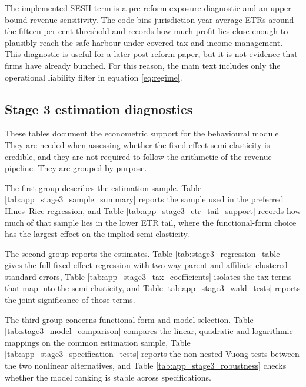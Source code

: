 \documentclass[11pt,a4paper]{article}
\begin{document}
The implemented SESH term is a pre-reform exposure diagnostic and an upper-bound revenue sensitivity. The code bins jurisdiction-year average ETRs around the fifteen per cent threshold and records how much profit lies close enough to plausibly reach the safe harbour under covered-tax and income management. This diagnostic is useful for a later post-reform paper, but it is not evidence that firms have already bunched. For this reason, the main text includes only the operational liability filter in equation \eqref{eq:regime}.

\subsection{Stage 3 estimation diagnostics}\label{app:results_stage3}

These tables document the econometric support for the behavioural module. They are needed when assessing whether the fixed-effect semi-elasticity is credible, and they are not required to follow the arithmetic of the revenue pipeline. They are grouped by purpose.

The first group describes the estimation sample. Table \ref{tab:app_stage3_sample_summary} reports the sample used in the preferred Hines--Rice regression, and Table \ref{tab:app_stage3_etr_tail_support} records how much of that sample lies in the lower ETR tail, where the functional-form choice has the largest effect on the implied semi-elasticity.




The second group reports the estimates. Table \ref{tab:stage3_regression_table} gives the full fixed-effect regression with two-way parent-and-affiliate clustered standard errors, Table \ref{tab:app_stage3_tax_coefficients} isolates the tax terms that map into the semi-elasticity, and Table \ref{tab:app_stage3_wald_tests} reports the joint significance of those terms.





The third group concerns functional form and model selection. Table \ref{tab:stage3_model_comparison} compares the linear, quadratic and logarithmic mappings on the common estimation sample, Table \ref{tab:app_stage3_specification_tests} reports the non-nested Vuong tests between the two nonlinear alternatives, and Table \ref{tab:app_stage3_robustness} checks whether the model ranking is stable across specifications.
\end{document}
